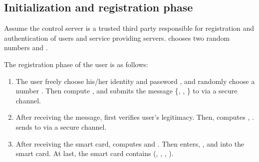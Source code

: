 \documentclass[preprint,12pt]{elsarticle}
\begin{document}
\begin{table}[!ht]
\centering
\caption{Notations used in our proposed protocol}
\end{table}

\subsection{Initialization and registration phase}
Assume the control server  is a trusted third party responsible for registration and authentication of users and service providing servers.  chooses two random numbers  and .

The registration phase of the user  is as follows:

\begin{enumerate}[Step 1:]
\item
The user  freely choose his/her identity  and password , and randomly choose a number . Then  compute , and submits the message \{, , \} to  via a secure channel.
\item
After receiving the message,  first verifies user's legitimacy. Then,  computes , .  sends  to  via a secure channel.
\item
After receiving the smart card,  computes  and . Then  enters, ,  and  into the smart card. At last, the smart card contains (, , , ).
\end{enumerate}
\end{document}
